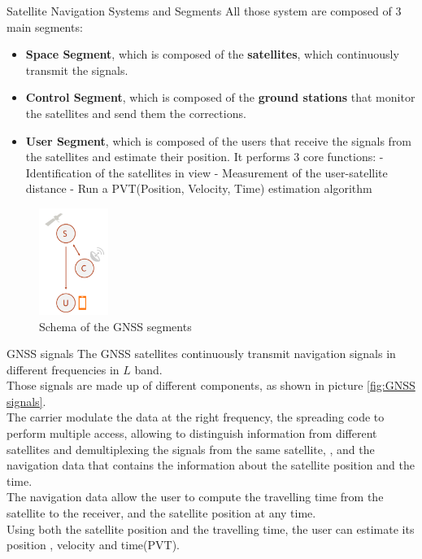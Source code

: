 \begin{section}{Satellite Navigation Systems and Segments}
    All those system are composed of 3 main segments:
    \begin{itemize}
      \item \textbf{Space Segment}, which is composed of the \textbf{satellites}, which continuously
        transmit the signals.
      \item \textbf{Control Segment}, which is composed of the \textbf{ground stations} that monitor
        the satellites and send them the corrections.
      \item \textbf{User Segment}, which is composed of the users that receive the signals from the
        satellites and estimate their position. It performs 3 core functions:
        \subitem - Identification of the satellites in view
        \subitem - Measurement of the user-satellite distance
        \subitem - Run a PVT(Position, Velocity, Time) estimation algorithm
    \end{itemize}
    \begin{figure}[h]
      \centering
      \includegraphics[width=0.2\textwidth]{img/wireless/GNSS segments.png}
      \caption{Schema of the GNSS segments}
      \label{fig:GNSS segments}
    \end{figure}
    \begin{subsection}{GNSS signals}
      The GNSS satellites continuously transmit navigation signals in different frequencies in $L$ 
      band.\\
      Those signals are made up of different components, as shown in picture \ref{fig:GNSS signals}.\\
      The carrier modulate the data at the right frequency, the spreading code to perform multiple
      access, allowing to distinguish information from different satellites and demultiplexing the
      signals from the same satellite, , and the navigation data that contains the information 
      about the satellite position and the time.\\

      The navigation data allow the user to compute the travelling time from the satellite to the receiver,
      and the satellite position at any time.\\
      Using both the satellite position and the travelling time, the user can estimate its position
      , velocity and time(PVT).\\


\end{subsection}
\end{section}
